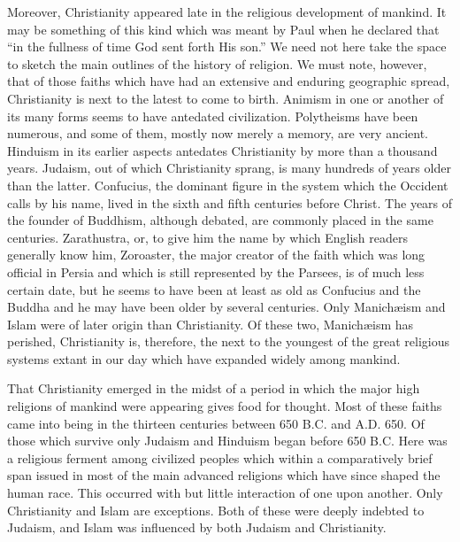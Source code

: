 Moreover, Christianity appeared late in the religious development of mankind. It may be something of this kind which was meant by Paul when he declared that ``in the fullness of time God sent forth His son.'' We need not here take the space to sketch the main outlines of the history of religion. We must note, however, that of those faiths which have had an extensive and enduring geographic spread, Christianity is next to the latest to come to birth. Animism in one or another of its many forms seems to have antedated civilization. Polytheisms have been numerous, and some of them, mostly now merely a memory, are very ancient. Hinduism in its earlier aspects antedates Christianity by more than a thousand years. Judaism, out of which Christianity sprang, is many hundreds of years older than the latter. Confucius, the dominant figure in the system which the Occident calls by his name, lived in the sixth and fifth centuries before Christ. The years of the founder of Buddhism, although debated, are commonly placed in the same centuries. Zarathustra, or, to give him the name by which English readers generally know him, Zoroaster, the major creator of the faith which was long official in Persia and which is still represented by the Parsees, is of much less certain date, but he seems to have been at least as old as Confucius and the Buddha and he may have been older by several centuries. Only Manichæism and Islam were of later origin than Christianity. Of these two, Manichæism has perished, Christianity is, therefore, the next to the youngest of the great religious systems extant in our day which have expanded widely among mankind.

That Christianity emerged in the midst of a period in which the major high religions of mankind were appearing gives food for thought. Most of these faiths came into being in the thirteen centuries between 650 B.C. and A.D. 650. Of those which survive only Judaism and Hinduism began before 650 B.C. Here was a religious ferment among civilized peoples which within a comparatively brief span issued in most of the main advanced religions which have since shaped the human race. This occurred with but little interaction of one upon another. Only Christianity and Islam are exceptions. Both of these were deeply indebted to Judaism, and Islam was influenced by both Judaism and Christianity.

